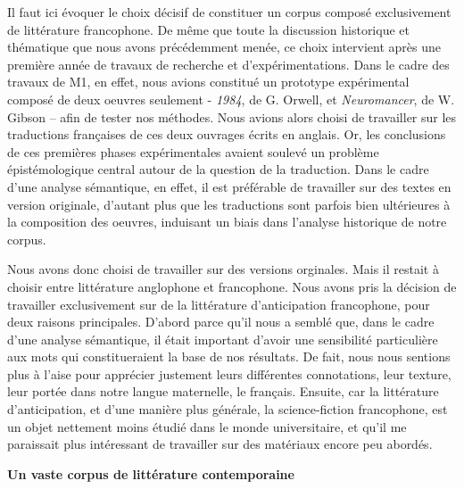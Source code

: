 \documentclass[letterpaper,portrait,12pt]{article}
\begin{document}
	Il faut ici \'{e}voquer le choix d\'{e}cisif de constituer un corpus compos\'{e} exclusivement de litt\'{e}rature francophone. De m\^{e}me que toute la discussion historique et th\'{e}matique que nous avons pr\'{e}c\'{e}demment men\'{e}e, ce choix intervient apr\`{e}s une premi\`{e}re ann\'{e}e de travaux de recherche et d'exp\'{e}rimentations. Dans le cadre des travaux de M1, en effet, nous avions constitu\'{e} un prototype exp\'{e}rimental compos\'{e} de deux oeuvres seulement - \emph{1984}, de G. Orwell, et \emph{Neuromancer}, de W. Gibson -- afin de tester nos m\'{e}thodes. Nous avions alors choisi de travailler sur les traductions fran\c{c}aises de ces deux ouvrages \'{e}crits en anglais. Or, les conclusions de ces premi\`{e}res phases exp\'{e}rimentales avaient soulev\'{e} un probl\`{e}me \'{e}pist\'{e}mologique central autour de la question de la traduction. Dans le cadre d'une analyse s\'{e}mantique, en effet, il est pr\'{e}f\'{e}rable de travailler sur des textes en version originale, d'autant plus que les traductions sont parfois bien ult\'{e}rieures \`{a} la composition des oeuvres, induisant un biais dans l'analyse historique de notre corpus. 





	Nous avons donc choisi de travailler sur des versions orginales. Mais il restait \`{a} choisir entre litt\'{e}rature anglophone et francophone. Nous avons pris la d\'{e}cision de travailler exclusivement sur de la litt\'{e}rature d'anticipation francophone, pour deux raisons principales. D'abord parce qu'il nous a sembl\'{e} que, dans le cadre d'une analyse s\'{e}mantique, il \'{e}tait important d'avoir une sensibilit\'{e} particuli\`{e}re aux mots qui constitueraient la base de nos r\'{e}sultats. De fait, nous nous sentions plus \`{a} l'aise pour appr\'{e}cier justement leurs diff\'{e}rentes connotations, leur texture, leur port\'{e}e dans notre langue maternelle, le fran\c{c}ais. Ensuite, car la litt\'{e}rature d'anticipation, et d'une mani\`{e}re plus g\'{e}n\'{e}rale, la science-fiction francophone, est un objet nettement moins \'{e}tudi\'{e} dans le monde universitaire, et qu'il me paraissait plus int\'{e}ressant de travailler sur des mat\'{e}riaux encore peu abord\'{e}s. 








	\textbf{Un vaste corpus de litt\'{e}rature contemporaine}
\end{document}
